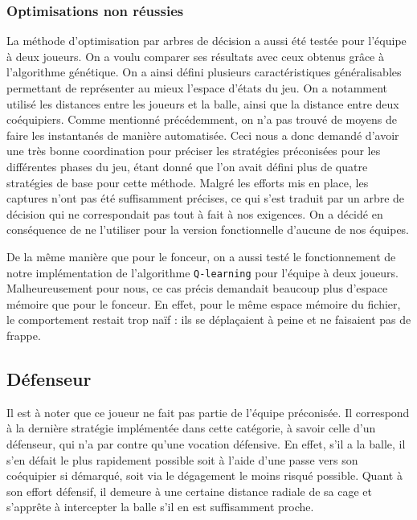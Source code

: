 \documentclass[12pt,a4paper]{article}
\begin{document}
\subsubsection*{Optimisations non r\'eussies}
La m\'ethode d'optimisation par arbres de d\'ecision a aussi \'et\'e test\'ee 
pour l'\'equipe \`a deux joueurs. On a voulu comparer ses r\'esultats avec ceux 
obtenus gr\^ace \`a l'algorithme g\'en\'etique. On a ainsi d\'efini plusieurs 
caract\'eristiques g\'en\'eralisables permettant de repr\'esenter au mieux 
l'espace d'\'etats du jeu. On a notamment utilis\'e les distances entre les 
joueurs et la balle, ainsi que la distance entre deux co\'equipiers. Comme 
mentionn\'e pr\'ec\'edemment, on n'a pas trouv\'e de moyens de faire les 
instantan\'es de mani\`ere automatis\'ee. Ceci nous a donc demand\'e d'avoir une 
tr\`es bonne coordination pour pr\'eciser les strat\'egies pr\'econis\'ees pour 
les diff\'erentes phases du jeu, \'etant donn\'e que l'on avait d\'efini plus 
de quatre strat\'egies de base pour cette m\'ethode. Malgr\'e les efforts mis 
en place, les captures n'ont pas \'et\'e suffisamment pr\'ecises, ce qui s'est 
traduit par un arbre de d\'ecision qui ne correspondait pas tout \`a fait \`a 
nos exigences.
On a d\'ecid\'e en cons\'equence de ne l'utiliser pour la version 
fonctionnelle d'aucune de nos \'equipes.

De la m\^eme mani\`ere que pour le fonceur, on a aussi test\'e le 
fonctionnement de notre impl\'ementation de l'algorithme \texttt{Q-learning} 
pour l'\'equipe \`a deux joueurs. Malheureusement pour nous, ce cas pr\'ecis 
demandait beaucoup plus d'espace m\'emoire que pour le fonceur. En effet, pour 
le m\^eme espace m\'emoire du fichier, le comportement restait trop na\"if : 
ils se d\'epla\c{c}aient \`a peine et ne faisaient pas de frappe.

\subsection*{D\'efenseur}
Il est \`a noter que ce joueur ne fait pas partie de l'\'equipe pr\'econis\'ee.
Il correspond \`a la derni\`ere strat\'egie impl\'ement\'ee dans cette 
cat\'egorie, \`a savoir celle d'un d\'efenseur, qui n'a par contre qu'une 
vocation d\'efensive. 
En effet, s'il a la balle, il s'en d\'efait le plus rapidement possible soit \`a 
l'aide d'une passe vers son co\'equipier si d\'emarqu\'e, soit via le 
d\'egagement le moins risqu\'e possible. 
Quant \`a son effort d\'efensif, il demeure \`a une certaine distance radiale 
de sa cage et s'appr\^ete \`a intercepter la balle s'il en est 
suffisamment proche.
\end{document}
